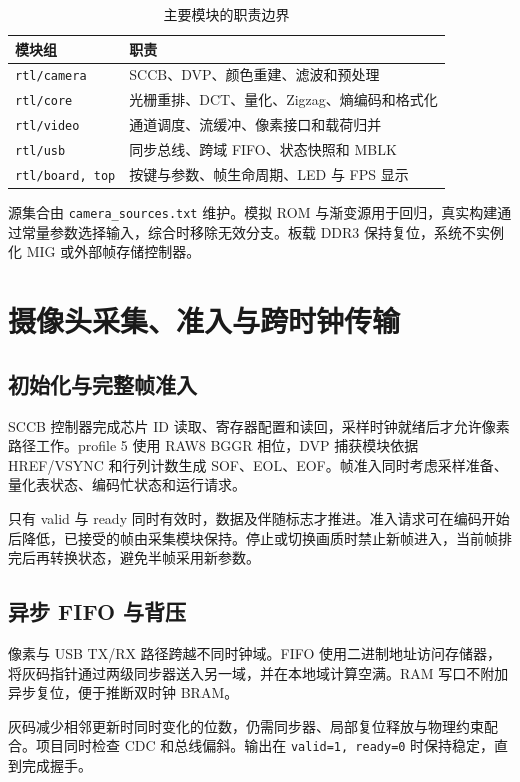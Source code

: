 \begin{table}[H]\centering\caption{主要模块的职责边界}
\small\begin{tabularx}{\linewidth}{@{}lY@{}}\toprule
模块组 & 职责\\\midrule
\texttt{rtl/camera} & SCCB、DVP、颜色重建、滤波和预处理\\
\texttt{rtl/core} & 光栅重排、DCT、量化、Zigzag、熵编码和格式化\\
\texttt{rtl/video} & 通道调度、流缓冲、像素接口和载荷归并\\
\texttt{rtl/usb} & 同步总线、跨域 FIFO、状态快照和 MBLK\\
\texttt{rtl/board, top} & 按键与参数、帧生命周期、LED 与 FPS 显示\\\bottomrule
\end{tabularx}\end{table}
源集合由 \texttt{camera\_sources.txt} 维护。模拟 ROM 与渐变源用于回归，真实构建通过常量参数选择输入，综合时移除无效分支。板载 DDR3 保持复位，系统不实例化 MIG 或外部帧存储控制器。
\clearpage

\section{摄像头采集、准入与跨时钟传输}
\subsection{初始化与完整帧准入}
SCCB 控制器完成芯片 ID 读取、寄存器配置和读回，采样时钟就绪后才允许像素路径工作。profile 5 使用 RAW8 BGGR 相位，DVP 捕获模块依据 HREF/VSYNC 和行列计数生成 SOF、EOL、EOF。帧准入同时考虑采样准备、量化表状态、编码忙状态和运行请求。

只有 valid 与 ready 同时有效时，数据及伴随标志才推进。准入请求可在编码开始后降低，已接受的帧由采集模块保持。停止或切换画质时禁止新帧进入，当前帧排完后再转换状态，避免半帧采用新参数。

\subsection{异步 FIFO 与背压}
像素与 USB TX/RX 路径跨越不同时钟域。FIFO 使用二进制地址访问存储器，将灰码指针通过两级同步器送入另一域，并在本地域计算空满。RAM 写口不附加异步复位，便于推断双时钟 BRAM。

灰码减少相邻更新时同时变化的位数，仍需同步器、局部复位释放与物理约束配合。项目同时检查 CDC 和总线偏斜。输出在 \texttt{valid=1, ready=0} 时保持稳定，直到完成握手。

